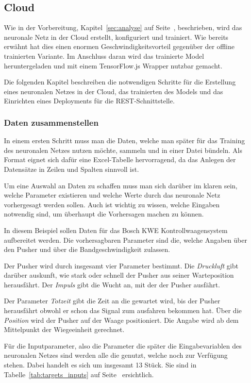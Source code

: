 \subsection{Cloud}
Wie in der Vorbereitung, Kapitel~\ref{sec:analyse} auf Seite~\pageref{sec:analyse}, beschrieben, wird das neuronale Netz
in der Cloud erstellt, konfiguriert und trainiert. Wie bereits erwähnt hat dies einen enormen Geschwindigkeitsvorteil
gegenüber der offline trainierten Variante. Im Anschluss daran wird das trainierte Model heruntergeladen und mit einem
TensorFlow.js Wrapper nutzbar gemacht.

Die folgenden Kapitel beschreiben die notwendigen Schritte für die Erstellung eines neuronalen Netzes in der Cloud, das
trainierten des Models und das Einrichten eines Deployments für die REST-Schnittstelle.

\subsubsection{Daten zusammenstellen}
In einem ersten Schritt muss man die Daten, welche man später für das Training des neuronalen Netzes nutzen möchte,
sammeln und in einer Datei bündeln. Als Format eignet sich dafür eine Excel-Tabelle hervorragend, da das Anlegen der
Datensätze in Zeilen und Spalten sinnvoll ist.

Um eine Auswahl an Daten zu schaffen muss man sich darüber im klaren sein, welche Parameter existieren und welche Werte
durch das neuronale Netz vorhergesagt werden sollen. Auch ist wichtig zu wissen, welche Eingaben notwendig sind, um
überhaupt die Vorhersagen machen zu können.

In diesem Beispiel sollen Daten für das Bosch KWE Kontrollwaagensystem aufbereitet werden. Die vorhersagbaren Parameter
sind die, welche Angaben über den Pusher und über die Bandgeschwindigkeit zulassen.

Der Pusher wird durch insgesamt vier Parameter bestimmt. Die \textit{Druckluft} gibt darüber auskunft, wie stark oder
schnell der Pusher aus seiner Warteposition herausfährt. Der \textit{Impuls} gibt die Wucht an, mit der der Pusher
ausfährt.

Der Parameter \textit{Totzeit} gibt die Zeit an die gewartet wird, bis der Pusher herausfährt obwohl er schon das Signal
zum ausfahren bekommen hat. Über die \textit{Position} wird der Pusher auf der Waage positioniert. Die Angabe wird ab
dem Mittelpunkt der Wiegeeinheit gerechnet.

Für die Inputparameter, also die Parameter die später die Eingabevariablen des neuronalen Netzes sind werden alle die
genutzt, welche noch zur Verfügung stehen. Dabei handelt es sich um insgesamt 13 Stück. Sie sind in
Tabelle~\ref{tab:targets_inputs} auf Seite~\pageref{tab:targets_inputs} ersichtlich.

